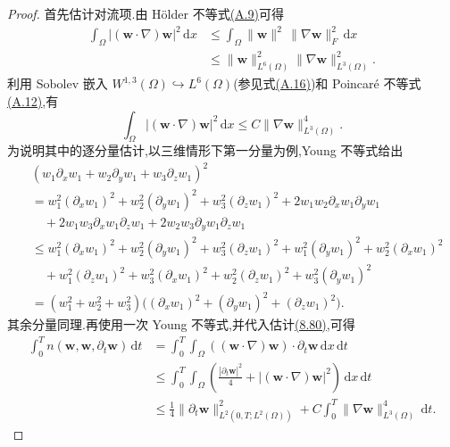 \begin{proof}
首先估计对流项.由 Hölder 不等式\hyperref[eq:appendix-a-9]{(A.9)}可得
\[
\begin{aligned}
 \int_\Omega |(\bm{w}\cdot\nabla)\bm{w}|^2\,\mathrm{d}x
 &\le \int_\Omega
       \|\bm{w}\|^2\,\|\nabla\bm{w}\|_F^2\,\mathrm{d}x\\
 &\le \|\bm{w}\|_{L^6(\Omega)}^2
       \|\nabla\bm{w}\|_{L^3(\Omega)}^2.
\end{aligned}
\]
利用 Sobolev 嵌入 $W^{1,3}(\Omega)\hookrightarrow L^6(\Omega)$(参见式\hyperref[eq:appendix-a-16]{(A.16)})和 Poincaré 不等式\hyperref[eq:appendix-a-12]{(A.12)},有
\begin{equation}\label{eq:smagorinsky-convection-bound}
 \int_\Omega |(\bm{w}\cdot\nabla)\bm{w}|^2\,\mathrm{d}x
 \le C\|\nabla\bm{w}\|_{L^3(\Omega)}^4.
\end{equation}
为说明其中的逐分量估计,以三维情形下第一分量为例,Young 不等式给出
\[
\begin{aligned}
 &(w_1\partial_xw_1+w_2\partial_yw_1+w_3\partial_zw_1)^2\\
 &=w_1^2(\partial_xw_1)^2+w_2^2(\partial_yw_1)^2
   +w_3^2(\partial_zw_1)^2
   +2w_1w_2\partial_xw_1\partial_yw_1\\
 &\quad+2w_1w_3\partial_xw_1\partial_zw_1
   +2w_2w_3\partial_yw_1\partial_zw_1\\
 &\le w_1^2(\partial_xw_1)^2+w_2^2(\partial_yw_1)^2
   +w_3^2(\partial_zw_1)^2
   +w_1^2(\partial_yw_1)^2+w_2^2(\partial_xw_1)^2\\
 &\quad+w_1^2(\partial_zw_1)^2+w_3^2(\partial_xw_1)^2
   +w_2^2(\partial_zw_1)^2+w_3^2(\partial_yw_1)^2\\
 &= (w_1^2+w_2^2+w_3^2)
       \bigl((\partial_xw_1)^2+(\partial_yw_1)^2
                         +(\partial_zw_1)^2\bigr).
\end{aligned}
\]
其余分量同理.再使用一次 Young 不等式,并代入估计\hyperref[eq:smagorinsky-convection-bound]{(8.80)},可得
\[
\begin{aligned}
 \int_0^T n(\bm{w},\bm{w},\partial_t\bm{w})\,\mathrm{d}t
 &=\int_0^T\int_\Omega
       ((\bm{w}\cdot\nabla)\bm{w})\cdot\partial_t\bm{w}
           \,\mathrm{d}x\,\mathrm{d}t\\
 &\le \int_0^T\int_\Omega
       \left(\frac{|\partial_t\bm{w}|^2}{4}
                    +|(\bm{w}\cdot\nabla)\bm{w}|^2\right)
                      \,\mathrm{d}x\,\mathrm{d}t\\
 &\le \frac14
       \|\partial_t\bm{w}\|_{L^2(0,T;L^2(\Omega))}^2
       +C\int_0^T\|\nabla\bm{w}\|_{L^3(\Omega)}^4\,\mathrm{d}t.
\end{aligned}
\]
\end{proof}
